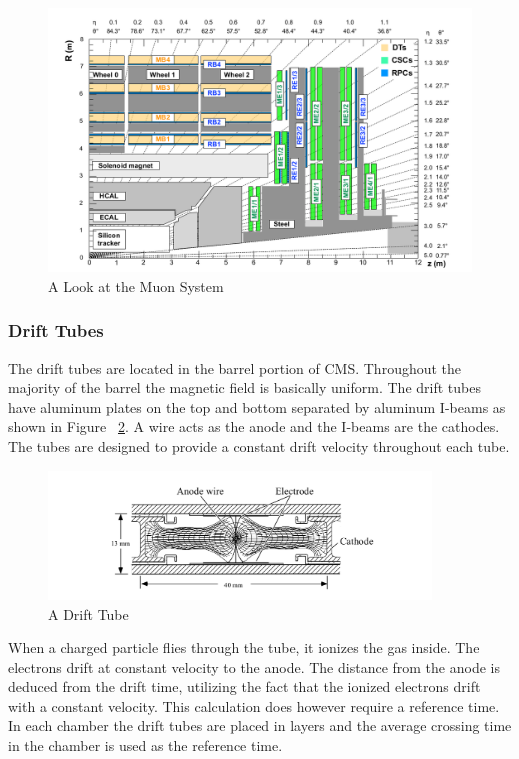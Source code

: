 \begin{figure}[h!]
  \centering
  \includegraphics[width=5.5in]{images/muon_system.png}
  \caption
   {A Look at the Muon System \cite{muonsys}}
  \label{fig:muonsysfig}
\end{figure}

\FloatBarrier
\subsubsection{Drift Tubes}

The drift tubes are located in the barrel portion of CMS. Throughout the majority of the barrel the magnetic field is basically uniform. The drift tubes have aluminum plates on the top and bottom separated by aluminum I-beams as shown in Figure ~\ref{fig:dt}. A wire acts as the anode and the I-beams are the cathodes. The tubes are designed to provide a constant drift velocity throughout each tube.
\begin{figure}[h!]
  \centering
  \includegraphics[width=4in]{images/DT.png}
  \caption
   {A Drift Tube \cite{mutdr}}
  \label{fig:dt}
\end{figure}

When a charged particle flies through the tube, it ionizes the gas inside. The electrons drift at constant velocity to the anode. The distance from the anode is deduced from the drift time, utilizing the fact that the ionized electrons drift with a constant velocity. This calculation does however require a reference time. In each chamber the drift tubes are placed in layers and the average crossing time in the chamber is used as the reference time.

